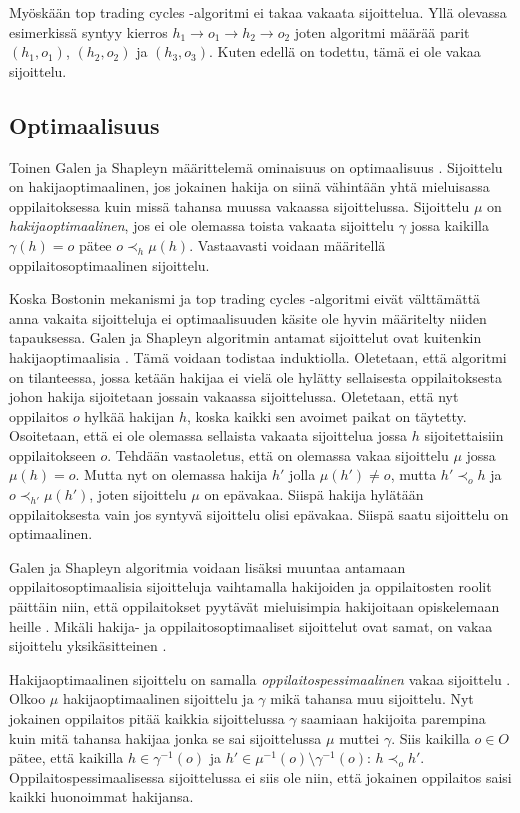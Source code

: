 \documentclass[gradu, twoside]{tktltiki}
\begin{document}
Myöskään top trading cycles -algoritmi ei takaa vakaata sijoittelua.
Yllä olevassa esimerkissä syntyy kierros $h_1 \rightarrow o_1
\rightarrow h_2 \rightarrow o_2$ joten algoritmi määrää parit $(h_1,
o_1)$, $(h_2, o_2)$ ja $(h_3, o_3)$. Kuten edellä on todettu, tämä ei
ole vakaa sijoittelu.

\subsection{Optimaalisuus}

Toinen Galen ja Shapleyn määrittelemä ominaisuus on optimaalisuus
\cite{galeshapley62}. Sijoittelu on hakijaoptimaalinen, jos jokainen
hakija on siinä vähintään yhtä mieluisassa oppilaitoksessa kuin missä
tahansa muussa vakaassa sijoittelussa. Sijoittelu $\mu$ on
\emph{hakijaoptimaalinen}, jos ei ole olemassa toista vakaata
sijoittelu $\gamma$ jossa kaikilla $\gamma(h) = o$ pätee $o \prec_h
\mu(h)$. Vastaavasti voidaan määritellä oppilaitosoptimaalinen
sijoittelu.

Koska Bostonin mekanismi ja top trading cycles -algoritmi eivät
välttämättä anna vakaita sijoitteluja ei optimaalisuuden käsite ole
hyvin määritelty niiden tapauksessa. Galen ja Shapleyn algoritmin
antamat sijoittelut ovat kuitenkin hakijaoptimaalisia
\cite{galeshapley62}. Tämä voidaan todistaa induktiolla. Oletetaan,
että algoritmi on tilanteessa, jossa ketään hakijaa ei vielä ole
hylätty sellaisesta oppilaitoksesta johon hakija sijoitetaan jossain
vakaassa sijoittelussa. Oletetaan, että nyt oppilaitos $o$ hylkää
hakijan $h$, koska kaikki sen avoimet paikat on täytetty. Osoitetaan,
että ei ole olemassa sellaista vakaata sijoittelua jossa $h$
sijoitettaisiin oppilaitokseen $o$. Tehdään vastaoletus, että on
olemassa vakaa sijoittelu $\mu$ jossa $\mu(h) = o$. Mutta nyt on
olemassa hakija $h'$ jolla $\mu(h') \neq o$, mutta $h' \prec_o h$ ja
$o \prec_{h'} \mu(h')$, joten sijoittelu $\mu$ on epävakaa. Siispä
hakija hylätään oppilaitoksesta vain jos syntyvä sijoittelu olisi
epävakaa. Siispä saatu sijoittelu on optimaalinen.

Galen ja Shapleyn algoritmia voidaan lisäksi muuntaa antamaan
oppilaitosoptimaalisia sijoitteluja vaihtamalla hakijoiden ja
oppilaitosten roolit päittäin niin, että oppilaitokset pyytävät
mieluisimpia hakijoitaan opiskelemaan heille \cite{galeshapley62}.
Mikäli hakija- ja oppilaitosoptimaaliset sijoittelut ovat samat, on
vakaa sijoittelu yksikäsitteinen \cite{galeshapley62}.

Hakijaoptimaalinen sijoittelu on samalla
\emph{oppilaitospessimaalinen} vakaa sijoittelu \cite{gusfield89}.
Olkoo $\mu$ hakijaoptimaalinen sijoittelu ja $\gamma$ mikä tahansa muu
sijoittelu. Nyt jokainen oppilaitos pitää kaikkia sijoittelussa
$\gamma$ saamiaan hakijoita parempina kuin mitä tahansa hakijaa jonka
se sai sijoittelussa $\mu$ muttei $\gamma$. Siis kaikilla $o \in O$
pätee, että kaikilla $h \in \gamma^{-1}(o)$ ja $h' \in \mu^{-1}(o)
\setminus \gamma^{-1}(o)$: $h \prec_o h'$. Oppilaitospessimaalisessa
sijoittelussa ei siis ole niin, että jokainen oppilaitos saisi kaikki
huonoimmat hakijansa.
\end{document}
